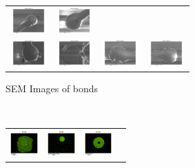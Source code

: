 \begin{figure}[h]
\begin{subfigure}[t]{0.4\textwidth}
\begin{tabular}{c c c c}
    \includegraphics[height=1cm]{Main/Ch2/extracted/SEM/In-EP-EDx_TLED-02-A1-s1_media_image.png} &
    \includegraphics[height=1cm]{Main/Ch2/extracted/SEM/In-EP-EDx_TLED-02-A1-s2_media_image.png} \\
    \includegraphics[height=1cm]{Main/Ch2/extracted/SEM/In-EP-EDx_TLED-02-A2-s1_media_image.png} &
    \includegraphics[height=1cm]{Main/Ch2/extracted/SEM/In-EP-EDx_TLED-02-A2-s2_media_image.png} &
    \includegraphics[height=1cm]{Main/Ch2/extracted/SEM/In-EP-EDx_TLED-02-B2-s1_media_image.png} &
    \includegraphics[height=1cm]{Main/Ch2/extracted/SEM/In-EP-EDx_TLED-02-B2-s2_media_image.png} \\
    \end{tabular}
    \caption{SEM Images of bonds}
    \label{fig:SEM_indium_2}
\end{subfigure}
~
\begin{subfigure}[t]{0.4\textwidth}
    \centering
    \begin{tabular}{c c c c}
    \includegraphics[height=1cm]{Main/Ch2/extracted/Indium/In-EP-EDx_TBP-01-A1-s1_media_image7.png} &
    \includegraphics[height=1cm]{Main/Ch2/extracted/Indium/In-EP-EDx_TBP-01-A1-s2_media_image7.png} &
    \includegraphics[height=1cm]{Main/Ch2/extracted/Indium/In-EP-EDx_TBP-01-A2-s1_media_image7.png} &

\end{tabular}
\end{subfigure}
\end{figure}
